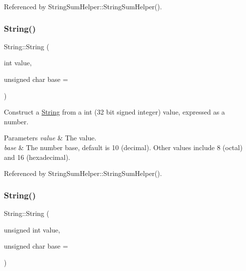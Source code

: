 Referenced by String\+Sum\+Helper\+::\+String\+Sum\+Helper().

\mbox{\label{class_string_a5528e1c6d322a9ee21f155c291ea67d1}} 
\subsubsection{\texorpdfstring{String()}{String()}\hspace{0.1cm}{\footnotesize\ttfamily [8/13]}}
{\footnotesize\ttfamily String\+::\+String (\begin{DoxyParamCaption}\item[{int}]{value,  }\item[{unsigned char}]{base = {} }\end{DoxyParamCaption})\hspace{0.3cm}{\ttfamily [explicit]}}



Construct a \hyperlink{class_string}{String} from a int (32 bit signed integer) value, expressed as a number. 


\begin{DoxyParams}{Parameters}
{\em value} & The value.\\
\hline
{\em base} & The number base, default is 10 (decimal). Other values include 8 (octal) and 16 (hexadecimal). \\
\hline
\end{DoxyParams}


Referenced by String\+Sum\+Helper\+::\+String\+Sum\+Helper().

\mbox{\label{class_string_a53134e2b38eb0d114f886e807a3753ae}} 
\subsubsection{\texorpdfstring{String()}{String()}\hspace{0.1cm}{\footnotesize\ttfamily [9/13]}}
{\footnotesize\ttfamily String\+::\+String (\begin{DoxyParamCaption}\item[{unsigned int}]{value,  }\item[{unsigned char}]{base = {} }\end{DoxyParamCaption})\hspace{0.3cm}{\ttfamily [explicit]}}



